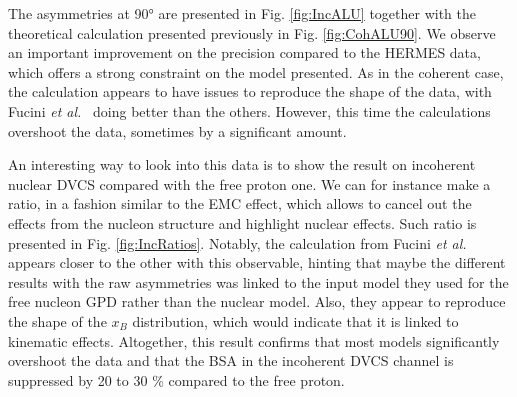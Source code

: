 \documentclass[aps,prc,preprint,superscriptaddress]{revtex4}
\begin{document}
The asymmetries at 90° are presented in Fig. \ref{fig:IncALU} together with the theoretical
calculation presented previously in Fig. \ref{fig:CohALU90}. We observe an important improvement
on the precision compared to 
the HERMES data, which offers a strong constraint on the model presented. As in the
coherent case, the calculation appears to have issues to reproduce the shape of the data,
with Fucini {\it et al.}~\cite{Fucini:2019xlc} doing better than the others.
However, this time the calculations overshoot the data, sometimes by a significant amount.

An interesting way to look into this data is to show the result on incoherent nuclear DVCS compared 
with the free proton one. We can for instance make a ratio, in a fashion similar to the EMC 
effect, which allows to cancel out
the effects from the nucleon structure and highlight nuclear effects. Such ratio is presented
in Fig. \ref{fig:IncRatios}.
Notably, the calculation from Fucini {\it et al.}~\cite{Fucini:2019xlc} appears closer to the
other with this observable, hinting that maybe the different results with the raw asymmetries 
was linked to the input model they used for the free nucleon GPD rather than the nuclear model. 
Also, they appear to reproduce the 
shape of the $x_B$ distribution, which would indicate that it is linked to kinematic effects.
Altogether, this result confirms that most models significantly overshoot the data and that 
the BSA in the incoherent DVCS channel is suppressed by 20 to 30 \% compared to the free proton.
\end{document}
